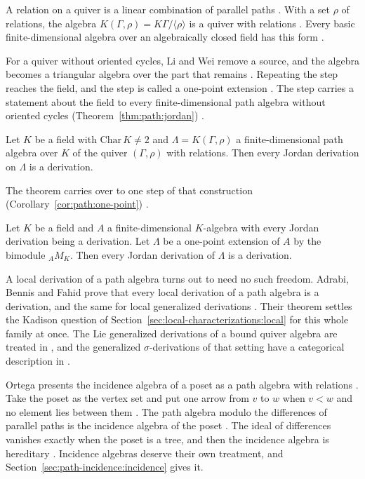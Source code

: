 A relation on a quiver is a linear combination of parallel paths
\cite[p.~81]{LiWei2018}. With a set $\rho$ of relations, the algebra
$K(\Gamma,\rho)=K\Gamma/\langle\rho\rangle$ is a quiver with relations
\cite[p.~81]{LiWei2018}. Every basic finite-dimensional algebra over an
algebraically closed field has this form \cite[p.~81]{LiWei2018}.

For a quiver without oriented cycles, Li and Wei remove a source, and the algebra
becomes a triangular algebra over the part that remains
\cite[p.~83]{LiWei2018}. Repeating the step reaches the field, and the step is
called a one-point extension \cite[p.~83]{LiWei2018}. The step carries a statement
about the field to every finite-dimensional path algebra without oriented cycles (Theorem~\ref{thm:path:jordan})
\cite[p.~85]{LiWei2018}.\begin{theorem}\label{thm:path:jordan}
Let $K$ be a field with $\mathrm{Char}\,K\neq 2$ and $\Lambda=K(\Gamma,\rho)$ a
finite-dimensional path algebra over $K$ of the quiver $(\Gamma,\rho)$ with
relations. Then every Jordan derivation on $\Lambda$ is a derivation.
\end{theorem}

The theorem carries over to one step of that construction (Corollary~\ref{cor:path:one-point})
\cite[p.~86]{LiWei2018}.\begin{corollary}\label{cor:path:one-point}
Let $K$ be a field and $A$ a finite-dimensional $K$-algebra with every Jordan
derivation being a derivation. Let $\Lambda$ be a one-point extension of $A$ by the
bimodule $_{A}M_{K}$. Then every Jordan derivation of $\Lambda$ is a derivation.
\end{corollary}

A local derivation of a path algebra turns out to need no such freedom. Adrabi,
Bennis and Fahid prove that every local derivation of a path algebra is a
derivation, and the same for local generalized derivations
\cite[Theorem~3, p.~391]{AdrabiBennisFahid2023Local}. Their theorem settles the
Kadison question of Section~\ref{sec:local-characterizations:local} for this
whole family at once. The Lie generalized derivations of a bound quiver algebra
are treated in \cite[p.~1950]{AdrabiBennisFahid2021Lie}, and the generalized
$\sigma$-derivations of that setting have a categorical description in
\cite[p.~4754]{AdrabiBennisFahid2023Categorical}.

Ortega presents the incidence algebra of a poset as a path algebra with relations
\cite[p.~232]{Ortega2006}. Take the poset as the vertex set and put one arrow from $v$ to $w$ when $v<w$ and no
element lies between them \cite[p.~232]{Ortega2006}. The path algebra modulo the
differences of parallel paths is the incidence algebra of the poset
\cite[p.~232]{Ortega2006}. The ideal of
differences vanishes exactly when the poset is a tree, and then the incidence algebra
is hereditary \cite[p.~232]{Ortega2006}. Incidence algebras deserve their own
treatment, and Section~\ref{sec:path-incidence:incidence} gives it.


